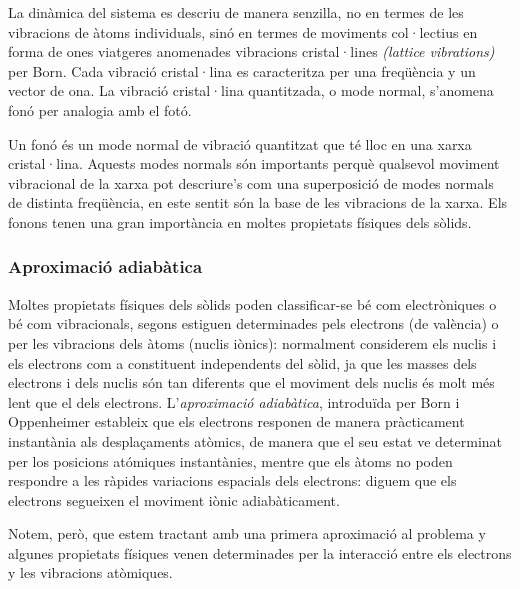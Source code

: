 \documentclass[12pt]{article} %
\begin{document}
La dinàmica del sistema es descriu de manera senzilla, no en termes de les vibracions de àtoms individuals, sinó en termes de moviments col·lectius en forma de ones viatgeres anomenades vibracions cristal·lines \emph{(\foreignlanguage{english}{lattice vibrations})} per Born. Cada vibració cristal·lina es caracteritza per una freqüència y un vector de ona.
La vibració cristal·lina quantitzada, o mode normal, s'anomena fonó per analogia amb el fotó. %

Un fonó és un mode normal de vibració quantitzat que té lloc en una xarxa cristal·lina.  Aquests modes normals són importants perquè qualsevol moviment vibracional de la xarxa pot descriure's com una superposició de modes normals de distinta freqüència, en este sentit són la base de les vibracions de la xarxa. Els fonons tenen una gran importància en moltes propietats físiques dels sòlids. 


\subsubsection{Aproximació adiabàtica}

Moltes propietats físiques dels sòlids poden classificar-se bé com electròniques o bé com vibracionals, segons estiguen determinades pels electrons (de valència) o per les vibracions dels àtoms (nuclis iònics): normalment considerem els nuclis i els electrons com a constituent independents del sòlid, ja que les masses dels electrons i dels nuclis són tan diferents que el moviment dels nuclis és molt més lent que el dels electrons. L'\emph{aproximació adiabàtica}, introduïda per Born i Oppenheimer \cite{ANDP:ANDP19273892002} estableix que els electrons responen de manera pràcticament instantània als desplaçaments atòmics, de manera que el seu estat ve determinat per los posicions atómiques instantànies, mentre que els àtoms no poden respondre a les ràpides variacions espacials dels electrons: diguem que els electrons segueixen el moviment iònic adiabàticament.

Notem, però, que estem tractant amb una primera aproximació al problema y algunes propietats físiques venen determinades per la interacció entre els electrons y les vibracions atòmiques.
\end{document}
